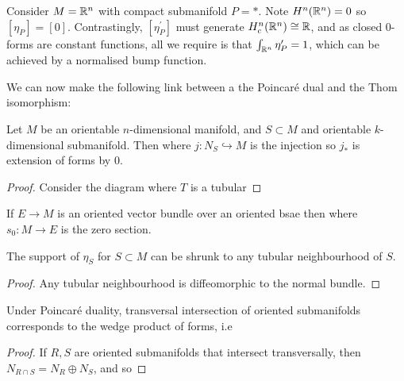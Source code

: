 \documentclass{article}
\begin{document}
\begin{example}
	Consider $M= \mathbb{R}^n$ with compact submanifold $P=\ast$. Note $H^n(\mathbb{R}^n)=0$ so $[\eta_P]=[0]$. Contrastingly, $[\eta_P^\prime]$ must generate $H^n_c(\mathbb{R}^n)\cong \mathbb{R}$, and as closed $0$-forms are constant functions, all we require is that $\int_{\mathbb{R}^n} \eta_P^\prime=1$, which can be achieved by a normalised bump function. 
\end{example}

We can now make the following link between a the Poincar\'e dual and the Thom isomorphism:

\begin{prop}
	Let $M$ be an orientable $n$-dimensional manifold, and $S \subset M$ and orientable $k$-dimensional submanifold. Then 
	where $j:N_S \hookrightarrow M$ is the injection so $j_\ast$ is extension of forms by 0. 
\end{prop}
\begin{proof}
	Consider the diagram 
	where $T$ is a tubular 
\end{proof}

\begin{corollary}
	If $E\to M$ is an oriented vector bundle over an oriented bsae then 
	where $s_0:M\to E$ is the zero section. 
\end{corollary}

\begin{corollary}
	The support of $\eta_S$ for $S\subset M$ can be shrunk to any tubular neighbourhood of $S$.
\end{corollary}
\begin{proof}
	Any tubular neighbourhood is diffeomorphic to the normal bundle. 
\end{proof}

\begin{prop}
	Under Poincar\'e duality, transversal intersection of oriented submanifolds corresponds to the wedge product of forms, i.e 
\end{prop}
\begin{proof}
	If $R,S$ are oriented submanifolds that intersect transversally, then $N_{R\cap S} = N_R \oplus N_S$, and so 
\end{proof}
\end{document}
